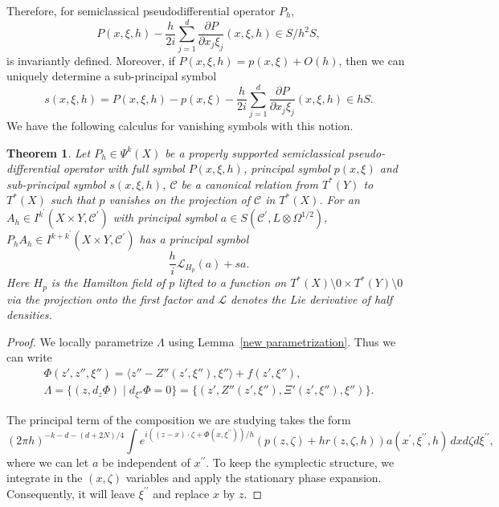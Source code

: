 \documentclass[10pt, a4paper, twoside]{amsart}
\numberwithin{equation}{section}
\newtheorem{theorem}{Theorem}
\theoremstyle{remark}
\begin{document}
\begin{appendix}
	Therefore, for semiclassical pseudodifferential operator $P_h$, $$P(x, \xi, h)  - \frac{h}{2i} \sum_{j = 1}^d \frac{\partial P}{\partial x_j \xi_j}(x, \xi, h)  \in S / h^2 S,$$ is invariantly defined. 
	Moreover, if $P(x, \xi, h) = p(x, \xi) + O(h)$, then  we can uniquely determine a sub-principal symbol 
	\begin{equation}
	s(x, \xi, h) = P(x, \xi, h) - p(x, \xi)  - \frac{h}{2i} \sum_{j = 1}^d \frac{\partial P}{\partial x_j \xi_j}(x, \xi, h) \in hS.
	\label{subpr}\end{equation}
	We have the following calculus for vanishing symbols with this notion.
	
	\begin{theorem}\label{vanishing-symbol-calculus-1}Let $P_h \in \Psi^k(X)$ be a properly supported semiclassical pseudo-differential operator with full symbol $P(x, \xi, h)$, principal symbol $p(x, \xi)$ and sub-principal symbol $s(x, \xi, h)$, $\mathcal{C}$ be a canonical relation from $T^\ast(Y)$ to $T^\ast(X)$ such that $p$ vanishes on the projection of $\mathcal{C}$ in $T^\ast(X)$. For an $A_h \in I^{k^\prime} (X \times Y, \mathcal{C}^\prime)$ with principal symbol $a \in S(\mathcal{C}^\prime, L \otimes \Omega^{1/2})$, $P_h A_h \in I^{k + k^\prime} (X \times Y, \mathcal{C}^\prime)$ has a principal symbol \begin{equation*} \frac{h}{i} \mathcal{L}_{H_{p}} (a) + s a.\end{equation*} Here $H_{p}$ is the Hamilton field of $p$ lifted to a function on $T^\ast(X) \setminus 0 \times T^\ast(Y) \setminus 0$ via the projection onto the first factor and $\mathcal{L}$ denotes the Lie derivative of half densities.\end{theorem}
	
	
	
	\begin{proof} We locally parametrize $\Lambda$ using Lemma~\ref{new parametrization}. Thus we can write
	$$\begin{gathered}
	\Phi(z', z'', \xi'') = \langle z'' - Z''(z', \xi''), \xi''\rangle + f(z', \xi''), \\
	\Lambda = \{ (z, d_z \Phi) \mid  d_{\xi''} \Phi = 0 \} =  \{ (z', Z''(z', \xi''), \Xi'(z', \xi''), \xi'') \}. 
	\end{gathered}$$
	
	The principal term of the composition we are studying takes the form 
	\begin{equation}(2 \pi h)^{- k - d - (d + 2N)/4} \int e^{i((z - x) \cdot \zeta + \Phi(x, \xi^{\prime\prime}))/h} (p(z, \zeta) + h r(z, \zeta, h)) a(x^\prime, \xi^{\prime\prime}, h) \, dx d\zeta d\xi^{\prime\prime},
	\label{comp-expr}\end{equation}
	 where we can let $a$ be independent of $x^{\prime\prime}$. To keep the symplectic structure, we integrate in the $(x, \zeta)$ variables and apply the stationary phase expansion. Consequently, it will leave $\xi^{\prime\prime}$ and replace $x$ by $z$.
	

\end{proof}
\end{appendix}
\end{document}
